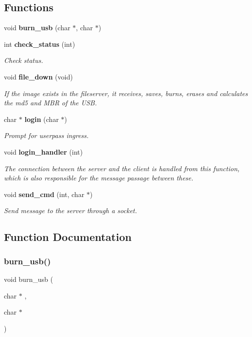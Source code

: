 \subsection*{Functions}
\begin{DoxyCompactItemize}
\item 
void \textbf{ burn\+\_\+usb} (char $\ast$, char $\ast$)
\item 
int \textbf{ check\+\_\+status} (int)
\begin{DoxyCompactList}\small\item\em Check status. \end{DoxyCompactList}\item 
void \textbf{ file\+\_\+down} (void)
\begin{DoxyCompactList}\small\item\em If the image exists in the fileserver, it receives, saves, burns, erases and calculates the md5 and M\+BR of the U\+SB. \end{DoxyCompactList}\item 
char $\ast$ \textbf{ login} (char $\ast$)
\begin{DoxyCompactList}\small\item\em Prompt for userpass ingress. \end{DoxyCompactList}\item 
void \textbf{ login\+\_\+handler} (int)
\begin{DoxyCompactList}\small\item\em The connection between the server and the client is handled from this function, which is also responsible for the message passage between these. \end{DoxyCompactList}\item 
void \textbf{ send\+\_\+cmd} (int, char $\ast$)
\begin{DoxyCompactList}\small\item\em Send message to the server through a socket. \end{DoxyCompactList}\end{DoxyCompactItemize}


\subsection{Function Documentation}
\mbox{\label{client_8h_a8f5170bbb9c0c247151775f99a577ff5}} 
\subsubsection{burn\+\_\+usb()}
{\footnotesize\ttfamily void burn\+\_\+usb (\begin{DoxyParamCaption}\item[{char $\ast$}]{,  }\item[{char $\ast$}]{ }\end{DoxyParamCaption})}

